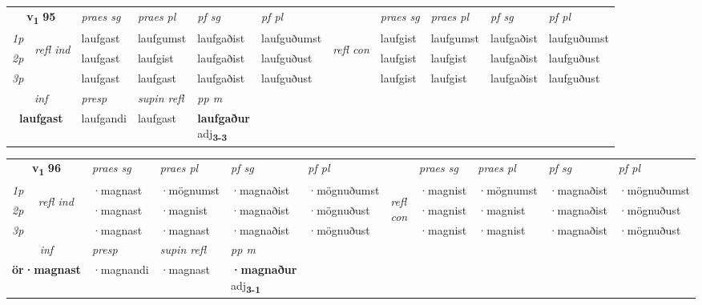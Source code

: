 \noindent
\begin{tabular}{lllllllllll} \toprule
\multicolumn{2}{c}{\textbf{v{\textsubscript{1}}} \Large{\textbf{95}}}  &  \textit{praes sg}  & \textit{praes pl}  &\textit{ pf sg} & \textit{pf pl} &  &  \textit{praes sg}  & \textit{praes pl}  & \textit{pf sg} & \textit{pf pl } \\*
	\cmidrule{3-6} \cmidrule{8-11}
 {\textit{1p}} & \multirow{3}{*}{\begin{turn}{90}\textit{refl ind}\end{turn}}  & laufgast & laufgumst & laufgaðist & laufguðumst & \multirow{3}{*}{\begin{turn}{90}\textit{refl con}\end{turn}}  &laufgist & laufgumst & laufgaðist & laufguðumst \\*
 {\textit{2p}} &  & laufgast & laufgist & laufgaðist & laufguðust & &laufgist & laufgist & laufgaðist & laufguðust \\*
 {\textit{3p}}  & & laufgast & laufgast & laufgaðist & laufguðust & & laufgist & laufgist& laufgaðist & laufguðust \\*
\cmidrule{3-6} \cmidrule{8-11}

   \multicolumn{2}{c}{\textit{inf}}     & \textit{presp}  & \textit{supin refl} & \textit{pp m} \\*
  \multicolumn{2}{c}{\textbf{laufgast}}      & laufgandi  & laufgast & \specialcell{\textbf{laufgaður} \\ adj\textbf{\textsubscript{3-3}}} \\*
\end{tabular}

\noindent
\begin{tabular}{lllllllllll} \toprule
\multicolumn{2}{c}{\textbf{v{\textsubscript{1}}} \Large{\textbf{96}}}  &  \textit{praes sg}  & \textit{praes pl}  &\textit{ pf sg} & \textit{pf pl} &  &  \textit{praes sg}  & \textit{praes pl}  & \textit{pf sg} & \textit{pf pl } \\*
	\cmidrule{3-6} \cmidrule{8-11}
 {\textit{1p}} & \multirow{3}{*}{\begin{turn}{90}\textit{refl ind}\end{turn}}  & ·magnast & ·mögnumst & ·magnaðist & ·mögnuðumst & \multirow{3}{*}{\begin{turn}{90}\textit{refl con}\end{turn}}  &·magnist & ·mögnumst & ·magnaðist & ·mögnuðumst \\*
 {\textit{2p}} &  & ·magnast & ·magnist & ·magnaðist & ·mögnuðust & &·magnist & ·magnist & ·magnaðist & ·mögnuðust \\*
 {\textit{3p}}  & & ·magnast & ·magnast & ·magnaðist & ·mögnuðust & & ·magnist & ·magnist& ·magnaðist & ·mögnuðust \\*
\cmidrule{3-6} \cmidrule{8-11}

   \multicolumn{2}{c}{\textit{inf}}     & \textit{presp}  & \textit{supin refl} & \textit{pp m} \\*
  \multicolumn{2}{c}{\textbf{ör\allowbreak ·magnast}}      & ·magnandi  & ·magnast & \specialcell{\textbf{·magnaður} \\ adj\textbf{\textsubscript{3-1}}} \\*
\end{tabular}


